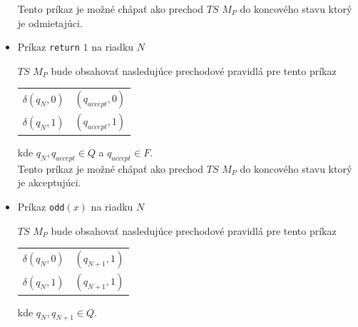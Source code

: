\documentclass[11pt,a4paper]{article}
\begin{document}
\begin{itemize}
\begin{flushright}
\begin{minipage}{0.90\textwidth}
            Tento príkaz je možné chápať ako prechod $TS$ $M_P$ do koncového stavu ktorý je odmietajúci.
        \end{minipage}
        \end{flushright}
    \item Príkaz \texttt{return} $1$ na riadku $N$\\[-1.5em]
        \begin{flushright}
        \begin{minipage}{0.90\textwidth}
            $TS$ $M_P$ bude obsahovať nasledujúce prechodové pravidlá pre tento príkaz
            \begin{center}
            \begin{tabular}{r@{ $=$ }l}
                $\delta(q_{N}, 0)$ & $(q_{accept}, 0)$\\
                $\delta(q_{N}, 1)$ & $(q_{accept}, 1)$
            \end{tabular}
            \end{center}
            kde $q_{N}, q_{accept} \in Q$ a $q_{accept} \in F$.\\

            Tento príkaz je možné chápať ako prechod $TS$ $M_P$ do koncového stavu ktorý je akceptujúci.
        \end{minipage}
        \end{flushright}
\newpage
    \item Príkaz \texttt{odd}$(x)$ na riadku $N$\\[-1.5em]
        \begin{flushright}
        \begin{minipage}{0.90\textwidth}
            $TS$ $M_P$ bude obsahovať nasledujúce prechodové pravidlá pre tento príkaz
            \begin{center}
            \begin{tabular}{r@{ $=$ }l}
                $\delta(q_{N}, 0)$ & $(q_{N+1}, 1)$\\
                $\delta(q_{N}, 1)$ & $(q_{N+1}, 1)$
            \end{tabular}
            \end{center}
            kde $q_{N}, q_{N+1} \in Q$.\\


\end{minipage}
\end{flushright}
\end{itemize}
\end{document}

